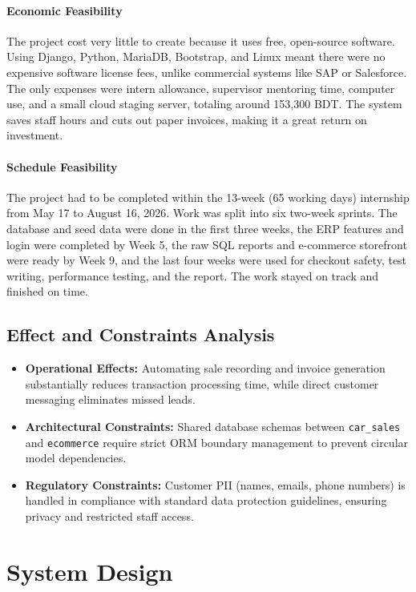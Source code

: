 \paragraph{Economic Feasibility}
The project cost very little to create because it uses free, open-source software. Using Django, Python, MariaDB, Bootstrap, and Linux meant there were no expensive software license fees, unlike commercial systems like SAP or Salesforce. The only expenses were intern allowance, supervisor mentoring time, computer use, and a small cloud staging server, totaling around 153,300 BDT. The system saves staff hours and cuts out paper invoices, making it a great return on investment.

\paragraph{Schedule Feasibility}
The project had to be completed within the 13-week (65 working days) internship from May 17 to August 16, 2026. Work was split into six two-week sprints. The database and seed data were done in the first three weeks, the ERP features and login were completed by Week 5, the raw SQL reports and e-commerce storefront were ready by Week 9, and the last four weeks were used for checkout safety, test writing, performance testing, and the report. The work stayed on track and finished on time.

\subsection{Effect and Constraints Analysis}
\begin{itemize}
    \item \textbf{Operational Effects:} Automating sale recording and invoice generation substantially reduces transaction processing time, while direct customer messaging eliminates missed leads.
    \item \textbf{Architectural Constraints:} Shared database schemas between \texttt{car\_sales} and \texttt{ecommerce} require strict ORM boundary management to prevent circular model dependencies.
    \item \textbf{Regulatory Constraints:} Customer PII (names, emails, phone numbers) is handled in compliance with standard data protection guidelines, ensuring privacy and restricted staff access.
\end{itemize}

\section{System Design}

